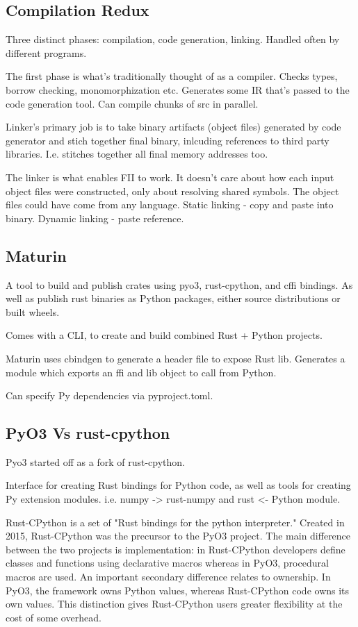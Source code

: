 \documentclass[12pt, a4, twoside]{article}
\begin{document}
\subsection*{Compilation Redux}

Three distinct phases: compilation, code generation, linking. Handled often by different programs.

The first phase is what's traditionally thought of as a compiler. Checks types, borrow checking, monomorphization etc. Generates some IR that's passed to the code generation tool. Can compile chunks of src in parallel. 

Linker's primary job is to take binary artifacts (object files) generated by code generator and stich together final binary, inlcuding references to third party libraries. I.e. stitches together all final memory addresses too.

The linker is what enables FII to work. It doesn't care about how each input object files were constructed, only about resolving shared symbols. The object files could have come from any language.
Static linking - copy and paste into binary. Dynamic linking - paste reference.

\subsection*{Maturin}

A tool to build and publish crates using pyo3, rust-cpython, and cffi bindings. As well as publish rust binaries as Python packages, either source distributions or built wheels.

Comes with a CLI, to create and build combined Rust + Python projects.

Maturin uses cbindgen to generate a header file to expose Rust lib. Generates a module which exports an ffi and lib object to call from Python.

Can specify Py dependencies via pyproject.toml.

\subsection*{PyO3 Vs rust-cpython}

Pyo3 started off as a fork of rust-cpython.

Interface for creating Rust bindings for Python code, as well as tools for creating Py extension modules. i.e. numpy -> rust-numpy and rust <- Python module.

Rust-CPython is a set of "Rust bindings for the python interpreter." Created in 2015, Rust-CPython was the precursor to the PyO3 project. The main difference between the two projects is implementation: in Rust-CPython developers define classes and functions using declarative macros whereas in PyO3, procedural macros are used. An important secondary difference relates to ownership. In PyO3, the framework owns Python values, whereas Rust-CPython code owns its own values. This distinction gives Rust-CPython users greater flexibility at the cost of some overhead.
\end{document}
